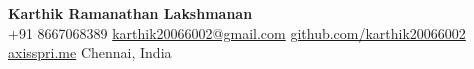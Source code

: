 
\begin{center}
  {\LARGE \textbf{Karthik Ramanathan Lakshmanan}}\\[2pt]
  +91 8667068389 \enskip\textbar\enskip
  \href{mailto:karthik20066002@gmail.com}{karthik20066002@gmail.com} \enskip\textbar\enskip
  \href{https://github.com/karthik20066002}{github.com/karthik20066002} \enskip\textbar\enskip
  \href{https://axisspri.me}{axisspri.me} \enskip\textbar\enskip
  Chennai, India
\end{center}
